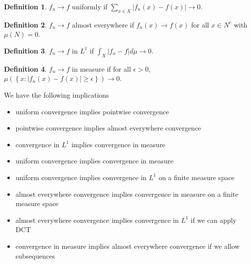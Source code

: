 \documentclass[11pt]{article}
\theoremstyle{definition}
\newtheorem{defn}{Definition}[section]
\newcommand{\set}[1]{\left\{ #1 \right\}}
\newcommand{\abs}[1]{\left\lvert#1\right\rvert} %
\begin{document}
\begin{defn}
  $f_n\to f$ uniformly if $\sum_{x\in X}\abs{f_n(x)-f(x)}\to0$.
\end{defn}

\begin{defn}
  $f_n\to f$ almost everywhere if $f_n(x)\to f(x)$ for all $x\in N^c$ with $\mu(N)=0$.
\end{defn}

\begin{defn}
  $f_n\to f$ in $L^1$ if $\int_X\abs{f_n-f}d\mu\to0$. 
\end{defn}

\begin{defn}
  $f_n\to f$ in measure if for all $\epsilon>0$,
  $\mu\left(\set{x:\abs{f_n(x)-f(x)}\ge\epsilon}\right)\to0$. 
\end{defn}



We have the following implications
\begin{itemize}
  \item uniform convergence implies pointwise convergence
  \item pointwise convergence implies almost everywhere convergence
  \item convergence in $L^1$ implies convergence in measure
  \item uniform convergence implies convergence in measure
  \item uniform convergence implies convergence in $L^1$ on a finite measure space
  \item almost everywhere convergence implies convergence in measure on a finite measure
  space
  \item almost everywhere convergence implies convergence in $L^1$ if we can apply DCT
  \item convergence in measure implies almost everywhere convergence if we allow
  subsequences
\end{itemize}
\end{document}
